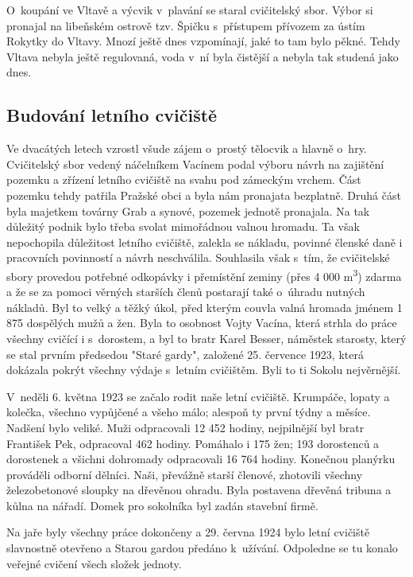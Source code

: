 \documentclass[a5paper, 11pt, twoside]{article}
\begin{document}
O~koupání ve Vltavě a výcvik v~plavání se staral cvičitelský sbor. Výbor
si pronajal na libeňském ostrově tzv. Špičku s~přístupem přívozem za
ústím Rokytky do Vltavy. Mnozí ještě dnes vzpomínají, jaké to tam bylo
pěkné. Tehdy Vltava nebyla ještě regulovaná, voda v~ní byla čistější a
nebyla tak studená jako dnes.

\subsection{Budování letního
cvičiště}

Ve dvacátých letech vzrostl všude zájem o~prostý tělocvik a hlavně
o~hry. Cvičitelský sbor vedený náčelníkem Vacínem podal výboru návrh na
zajištění pozemku a zřízení letního cvičiště na svahu pod zámeckým
vrchem. Část pozemku tehdy patřila Pražské obci a byla nám pronajata
bezplatně. Druhá část byla majetkem továrny Grab a synové, pozemek
jednotě pronajala. Na tak důležitý podnik bylo třeba svolat mimořádnou
valnou hromadu. Ta však nepochopila důležitost letního cvičiště, zalekla
se nákladu, povinné členské daně i pracovních povinností a návrh
neschválila. Souhlasila však s~tím, že cvičitelské sbory provedou
potřebné odkopávky i přemístění zeminy (přes 4 000 m\textsuperscript{3})
zdarma a že se za pomoci věrných starších členů postarají také o~úhradu
nutných nákladů. Byl to velký a těžký úkol, před kterým couvla valná
hromada jménem 1 875 dospělých mužů a žen. Byla to osobnost Vojty
Vacína, která strhla do práce všechny cvičící i s~dorostem, a byl to
bratr Karel Besser, náměstek starosty, který se stal prvním předsedou
"Staré gardy", založené 25. července 1923, která dokázala pokrýt
všechny výdaje s~letním cvičištěm. Byli to ti Sokolu nejvěrnější.

V~neděli 6. května 1923 se začalo rodit naše letní cvičiště. Krumpáče,
lopaty a kolečka, všechno vypůjčené a všeho málo; alespoň ty první týdny
a měsíce. Nadšení bylo veliké. Muži odpracovali 12 452 hodiny,
nejpilnější byl bratr František Pek, odpracoval 462 hodiny. Pomáhalo i
175 žen; 193 dorostenců a dorostenek a všichni dohromady odpracovali 16
764 hodiny. Konečnou planýrku prováděli odborní dělníci. Naši, převážně
starší členové, zhotovili všechny železobetonové sloupky na dřevěnou
ohradu. Byla postavena dřevěná tribuna a kůlna na nářadí. Domek pro
sokolníka byl zadán stavební firmě.

Na jaře byly všechny práce dokončeny a 29. června 1924 bylo letní
cvičiště slavnostně otevřeno a Starou gardou předáno k~užívání.
Odpoledne se tu konalo veřejné cvičení všech složek jednoty.
\end{document}
